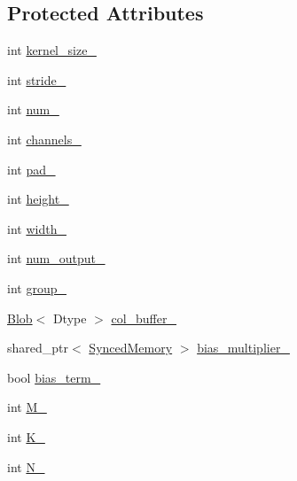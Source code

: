 \subsection*{Protected Attributes}
\begin{DoxyCompactItemize}
\item 
int \hyperlink{classcaffe_1_1_convolution_layer_aa1ca915eb8f781f4b168aaf21f39894b}{kernel\+\_\+size\+\_\+}
\item 
int \hyperlink{classcaffe_1_1_convolution_layer_a3ba44963cfa4f1bbcdf141d0199bc493}{stride\+\_\+}
\item 
int \hyperlink{classcaffe_1_1_convolution_layer_a6976c8be8d083e9ebe44756b5bc6479b}{num\+\_\+}
\item 
int \hyperlink{classcaffe_1_1_convolution_layer_ad70d4cbdcb75695b05b13bc479445aec}{channels\+\_\+}
\item 
int \hyperlink{classcaffe_1_1_convolution_layer_aba61b8e2065eda304e35fa3fa753eb80}{pad\+\_\+}
\item 
int \hyperlink{classcaffe_1_1_convolution_layer_a647a6b1172a630ac5f8b8eee9ef4e7b2}{height\+\_\+}
\item 
int \hyperlink{classcaffe_1_1_convolution_layer_a8286a1369f876ad29cea7f3dcca4a3a7}{width\+\_\+}
\item 
int \hyperlink{classcaffe_1_1_convolution_layer_af58ade65cda5954b9467f82df8999b89}{num\+\_\+output\+\_\+}
\item 
int \hyperlink{classcaffe_1_1_convolution_layer_a0a6f9c53ba515998258a98d523ff72b0}{group\+\_\+}
\item 
\hyperlink{classcaffe_1_1_blob}{Blob}$<$ Dtype $>$ \hyperlink{classcaffe_1_1_convolution_layer_a26feaeca8bbd36a64e782ab2e12b46d2}{col\+\_\+buffer\+\_\+}
\item 
shared\+\_\+ptr$<$ \hyperlink{classcaffe_1_1_synced_memory}{Synced\+Memory} $>$ \hyperlink{classcaffe_1_1_convolution_layer_a587cf49430daaacbd570e6a97c4364d2}{bias\+\_\+multiplier\+\_\+}
\item 
bool \hyperlink{classcaffe_1_1_convolution_layer_a0e8fbac1d24ba656fa6593191b21b32b}{bias\+\_\+term\+\_\+}
\item 
int \hyperlink{classcaffe_1_1_convolution_layer_a6a5386d7cc7b6b53653cdc9d17925116}{M\+\_\+}
\item 
int \hyperlink{classcaffe_1_1_convolution_layer_a917cf494c7845d3be0234dad754d4f49}{K\+\_\+}
\item 
int \hyperlink{classcaffe_1_1_convolution_layer_ad10263fbb69959ac83dee14deadc5f61}{N\+\_\+}
\end{DoxyCompactItemize}


